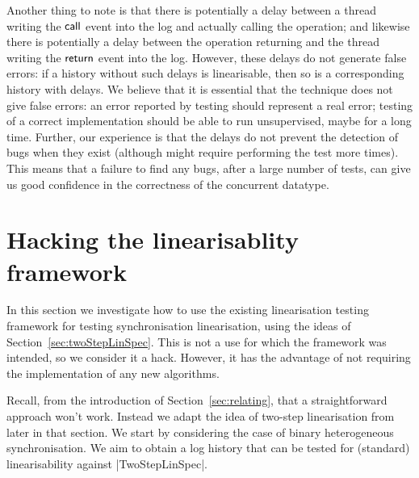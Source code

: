 Another thing to note is that there is potentially a delay between a thread
writing the $\mathsf{call}$ event into the log and actually calling the operation; and
likewise there is potentially a delay between the operation returning and the
thread writing the $\mathsf{return}$ event into the log.  However, these delays do not
generate false errors: if a history without such delays is linearisable, then
so is a corresponding history with delays.  We believe that it is essential
that the technique does not give false errors: an error reported by testing
should represent a real error; testing of a correct implementation should be
able to run unsupervised, maybe for a long time.  Further, our experience is
that the delays do not prevent the detection of bugs when they exist (although
might require performing the test more times).  This means that a failure to
find any bugs, after a large number of tests, can give us good confidence in
the correctness of the concurrent datatype.



\section{Hacking the linearisablity framework}
\label{sec:testing-hacking}


In this section we investigate how to use the existing linearisation testing
framework for testing synchronisation linearisation, using the ideas of
Section~\ref{sec:twoStepLinSpec}.  This is not a use for which the framework
was intended, so we consider it a hack.  However, it has the advantage of not
requiring the implementation of any new algorithms.

Recall, from the introduction of Section~\ref{sec:relating}, that a
straightforward approach won't work.  Instead we adapt the idea of two-step
linearisation from later in that section.  We start by considering the case of
binary heterogeneous synchronisation.  We aim to obtain a log history that can
be tested for (standard) linearisability against |TwoStepLinSpec|.

